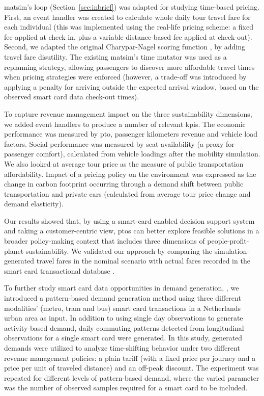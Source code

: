 \gls{matsim}'s loop (Section~\ref{sec:inbrief}) was adapted for studying time-based pricing. First, an event handler was created to calculate whole daily tour travel fare for each individual (this was implemented using the real-life pricing scheme: a fixed fee applied at check-in, plus a variable distance-based fee applied at check-out). Second, we adapted the original Charypar-Nagel scoring function \citep[][]{CharyparNagel2005ga4acts}, by adding travel fare disutility. The existing \gls{matsim}'s time mutator was used as a replanning strategy, allowing passengers to discover more affordable travel times when pricing strategies were enforced (however, a trade-off was introduced by applying a penalty for arriving outside the expected arrival window, based on the observed smart card data check-out times).

To capture revenue management impact on the three sustainability dimensions, we added event handlers to produce a number of relevant \glspl{kpi}. The economic performance was measured by \gls{pto}, passenger kilometers revenue and vehicle load factors. Social performance was measured by seat availability (a proxy for passenger comfort), calculated from vehicle loadings after the mobility simulation. We also looked at average tour price as the measure of public transportation affordability. Impact of a pricing policy on the environment was expressed as the change in carbon footprint occurring through a demand shift between public transportation and private cars (calculated from average tour price change and demand elasticity). 

Our results showed that, by using a smart-card enabled decision support system and taking a customer-centric view, \glspl{pto} can better explore feasible solutions in a broader policy-making context that includes three dimensions of people-profit-planet sustainability. We validated our approach by comparing the simulation-generated travel fares in the nominal scenario with actual fares recorded in the smart card transactional database \citep[see][]{LovricEtAl_DSS_2013}.

To further study smart card data opportunities in demand generation, \citet[][]{BoumanEtAl_AAMAS_2012}, we introduced a pattern-based demand generation method using three different modalities' (metro, tram and bus) smart card transactions in a Netherlands urban area as input. In addition to using single day observations to generate activity-based demand, daily commuting patterns detected from longitudinal observations for a single smart card were generated. In this study, generated demands were utilized to analyze time-shifting behavior under two different revenue management policies: a plain tariff (with a fixed price per journey and a price per unit of traveled distance) and an off-peak discount. The experiment was repeated for different levels of pattern-based demand, where the varied parameter was the number of observed samples required for a smart card to be included. 

